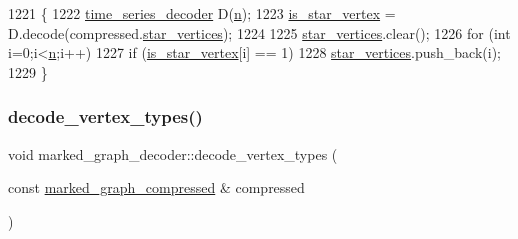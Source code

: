 \begin{DoxyCode}
1221 \{
1222   \hyperlink{classtime__series__decoder}{time\_series\_decoder} D(\hyperlink{classmarked__graph__decoder_aefc93611bc4a3e9a5d3956d97649a0e9}{n});
1223   \hyperlink{classmarked__graph__decoder_a5c5391206cf2965b8513248e505ba48f}{is\_star\_vertex} = D.decode(compressed.\hyperlink{classmarked__graph__compressed_a7a4ced4586e2e353f9076bd447df5208}{star\_vertices});
1224 
1225   \hyperlink{classmarked__graph__decoder_a06fc05827db14b675f7ecc2fd915b533}{star\_vertices}.clear();
1226   \textcolor{keywordflow}{for} (\textcolor{keywordtype}{int} i=0;i<\hyperlink{classmarked__graph__decoder_aefc93611bc4a3e9a5d3956d97649a0e9}{n};i++)
1227     \textcolor{keywordflow}{if} (\hyperlink{classmarked__graph__decoder_a5c5391206cf2965b8513248e505ba48f}{is\_star\_vertex}[i] == 1)
1228       \hyperlink{classmarked__graph__decoder_a06fc05827db14b675f7ecc2fd915b533}{star\_vertices}.push\_back(i);
1229 \}
\end{DoxyCode}
\mbox{\label{classmarked__graph__decoder_afc0aea714483a4dda31dd85fd20bfe5f}} 
\subsubsection{\texorpdfstring{decode\+\_\+vertex\+\_\+types()}{decode\_vertex\_types()}}
{\footnotesize\ttfamily void marked\+\_\+graph\+\_\+decoder\+::decode\+\_\+vertex\+\_\+types (\begin{DoxyParamCaption}\item[{const \hyperlink{classmarked__graph__compressed}{marked\+\_\+graph\+\_\+compressed} \&}]{compressed }\end{DoxyParamCaption})\hspace{0.3cm}{\ttfamily [private]}}


